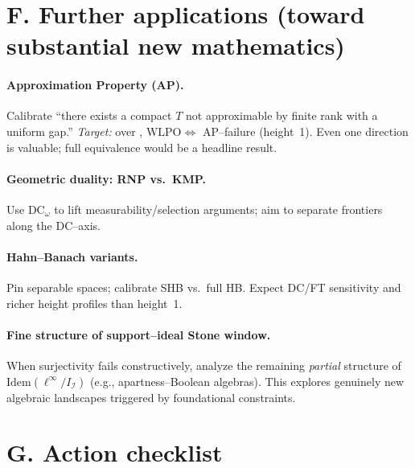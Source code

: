 \documentclass[11pt]{article}
\theoremstyle{definition}
\theoremstyle{remark}
\newcommand{\linf}{\ell^\infty}
\newcommand{\WLPO}{\mathrm{WLPO}}
\newcommand{\BISH}{\mathrm{BISH}}
\newcommand{\DCw}{\mathrm{DC}_\omega}
\begin{document}
\section{F. Further applications (toward substantial new mathematics)}

\paragraph{Approximation Property (AP).}
Calibrate ``there exists a compact $T$ not approximable by finite rank with a uniform gap.''  
\emph{Target:} over \BISH, $\WLPO \Leftrightarrow$ AP–failure (height~1). Even one direction is valuable; full equivalence would be a headline result.

\paragraph{Geometric duality: RNP vs.\ KMP.}
Use \(\DCw\) to lift measurability/selection arguments; aim to separate frontiers along the DC–axis.

\paragraph{Hahn–Banach variants.}
Pin separable spaces; calibrate SHB vs.\ full HB. Expect DC/FT sensitivity and richer height profiles than height~1.

\paragraph{Fine structure of support–ideal Stone window.}
When surjectivity fails constructively, analyze the remaining \emph{partial} structure of $\mathrm{Idem}(\linf/I_{\mathcal I})$ (e.g., apartness–Boolean algebras). This explores genuinely new algebraic landscapes triggered by foundational constraints.

\section{G. Action checklist}
\end{document}
